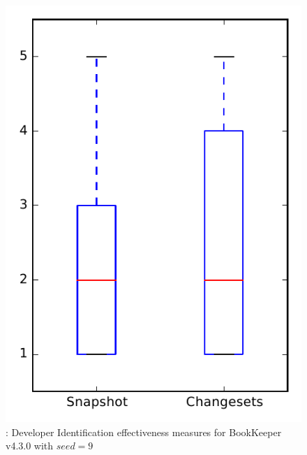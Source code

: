 
\begin{figure}
\centering
\includegraphics[height=0.4\textheight]{figures/dit_seed/rq1_bookkeeper_9}
\caption{\rtwo: Developer Identification effectiveness measures for BookKeeper v4.3.0 with $seed=9$}
\label{fig:dit_seed:rq1:bookkeeper}
\end{figure}
